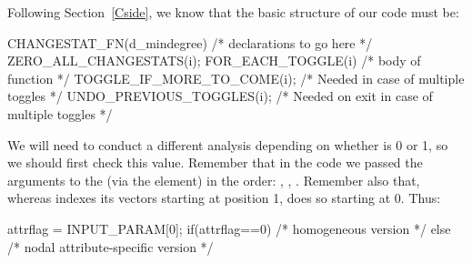 \documentclass[nojss]{jss}
\begin{document}
Following Section~\ref{Cside}, we know that the basic structure of our
 code must be:
\begin{CodeChunk}
\begin{CodeInput}
CHANGESTAT_FN(d_mindegree) {
  /* declarations to go here */
  ZERO_ALL_CHANGESTATS(i);
  FOR_EACH_TOGGLE(i) {
    /* body of function */
    TOGGLE_IF_MORE_TO_COME(i); /* Needed in case of multiple toggles */
  }
  UNDO_PREVIOUS_TOGGLES(i); /* Needed on exit in case of multiple toggles */
}
\end{CodeInput}
\end{CodeChunk}

We will need to conduct a different analysis depending on whether
 is 0 or 1, so we should first check this value. Remember that in
the  code we passed the arguments to the  (via the
 element) in the order: , ,
.
Remember also that, whereas
 indexes its vectors starting at position 1,  does so
starting at 0.  Thus:
\begin{CodeChunk}
\begin{CodeInput}
  attrflag = INPUT_PARAM[0];
  if(attrflag==0){
    /* homogeneous version */
  }else{
    /* nodal attribute-specific version */
  }
\end{CodeInput}
\end{CodeChunk}
\end{document}
